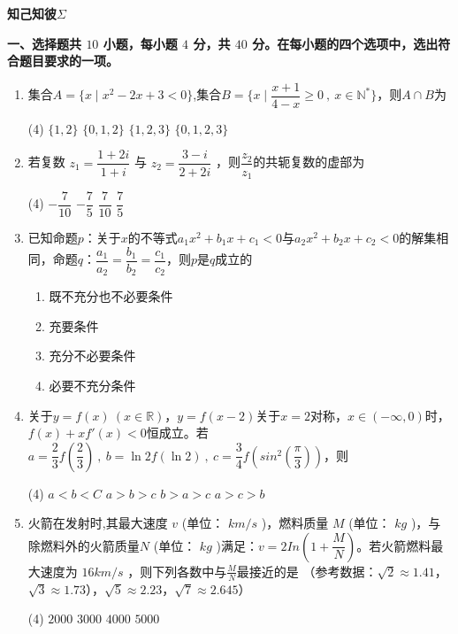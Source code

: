 \documentclass[11pt,a4paper]{ctexart}
\newcommand{\sectiontitle}[1]{
  \par\noindent\textbf{#1}\par%
  }
\begin{document}
\begin{center} 
    {\LARGE \textbf{知己知彼$\Sigma$}}\\[1em]
\end{center}

\sectiontitle{一、选择题共 $10$ 小题，每小题 $4$ 分，共 $40$ 分。在每小题的四个选项中，选出符合题目要求的一项。}

\begin{enumerate}

    \item 集合$A=\{x \mid x^2-2x+3 < 0\}$,集合$B=\{x\mid \dfrac{x+1}{4-x} \ge 0\ ,\ x \in \mathbb{N}^*\}$，则$A\cap B$为
    \begin{tasks}(4)
        \task $\{ 1,2\}$ 
        \task $\{ 0,1,2\}$
        \task $\{ 1,2,3\}$
        \task $\{ 0,1,2,3\}$
    \end{tasks}

    \item 若复数 $z_1=\dfrac{1+2i}{1+i}$ 与 $z_2=\dfrac{3-i}{2+2i}$ ，则$\dfrac{z_2}{z_1}$的共轭复数的虚部为
    \begin{tasks}(4)
        \task $-\dfrac{7}{10}$ 
        \task $-\dfrac{7}{5}$
        \task $\dfrac{7}{10}$
        \task $\dfrac{7}{5}$
    \end{tasks}

    \item 已知命题$p$：关于$x$的不等式$a_1x^2+b_1x+c_1<0$与$a_2x^2+b_2x+c_2<0$的解集相同，命题$q$：$\dfrac{a_1}{a_2}=\dfrac{b_1}{b_2}=\dfrac{c_1}{c_2}$，则$p$是$q$成立的
    \begin{enumerate}[label=(\Alph*)]
        \item 既不充分也不必要条件
        \item 充要条件
        \item 充分不必要条件
        \item 必要不充分条件
    \end{enumerate}

    \item 关于$y=f(x)\ (x\in \mathbb{R})$，$y=f(x-2)$关于$x=2$对称，$x \in (-\infty,0)$时，$f(x)+xf'(x)<0$恒成立。若$a=\dfrac{2}{3}f(\dfrac{2}{3})\ ,\ b=\ln 2f(\ln2)\ ,\ c=\dfrac{3}{4}f(sin^2(\dfrac{\pi}{3}))$，则
    \begin{tasks}(4)
        \task $a<b<C$ 
        \task $a>b>c$
        \task $b>a>c$
        \task $a>c>b$
    \end{tasks}
    
    \item 火箭在发射时,其最大速度 $v$ (单位： $km/s$ )，燃料质量 $M$ (单位： $kg$ )，与除燃料外的火箭质量$N$ (单位： $kg$ )满足：$v=2In(1+\dfrac{M}{N})$。若火箭燃料最大速度为 $16km/s$ ，则下列各数中与$\frac{M}{N}$最接近的是 （参考数据：$\sqrt{2} \approx 1.41$，$\sqrt{3} \approx 1.73$），$\sqrt{5} \approx 2.23$，$\sqrt{7} \approx 2.645$）
    \begin{tasks}(4)
        \task $2000$ 
        \task $3000$
        \task $4000$
        \task $5000$
    \end{tasks}
    \newpage


\end{enumerate}
\end{document}
